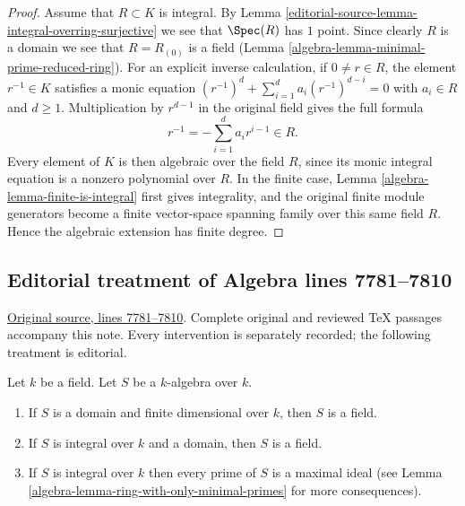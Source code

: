 \begin{proof}
Assume that $R \subset K$ is integral.
By Lemma \ref{editorial-source-lemma-integral-overring-surjective} we see that
$\Spec(R)$ has $1$ point. Since clearly $R$ is a domain we see
that $R = R_{(0)}$ is a field (Lemma \ref{algebra-lemma-minimal-prime-reduced-ring}).
For an explicit inverse calculation, if $0\ne r\in R$, the
element $r^{-1}\in K$ satisfies a monic equation
$(r^{-1})^d+\sum_{i=1}^d a_i(r^{-1})^{d-i}=0$ with $a_i\in R$
and $d\geq1$. Multiplication by $r^{d-1}$ in the original field
gives the full formula
$$
r^{-1}=-\sum_{i=1}^d a_i r^{i-1}\in R.
$$
Every element of $K$ is then algebraic over the field $R$, since
its monic integral equation is a nonzero polynomial over $R$.
In the finite case, Lemma \ref{algebra-lemma-finite-is-integral} first
gives integrality, and the original finite module generators
become a finite vector-space spanning family over this same field
$R$. Hence the algebraic extension has finite degree.
\end{proof}


\subsection{Editorial treatment of Algebra lines 7781--7810}

\hypertarget{algebra-context-083}{}

\noindent\href{https://github.com/stacks/stacks-project/blob/a04446e57ec1fbc252a871afcec7752fb2807b14/algebra.tex\#L7781}{Original source, lines 7781--7810}. Complete original and reviewed TeX passages accompany this note. Every intervention is separately recorded; the following treatment is editorial.


\begin{lemma}
\label{editorial-source-lemma-integral-over-field}
Let $k$ be a field. Let $S$ be a $k$-algebra over $k$.
\begin{enumerate}
\item If $S$ is a domain and finite dimensional over $k$,
then $S$ is a field.
\item If $S$ is integral over $k$ and a domain,
then $S$ is a field.
\item If $S$ is integral over $k$ then every prime of
$S$ is a maximal ideal (see
Lemma \ref{algebra-lemma-ring-with-only-minimal-primes}
for more consequences).
\end{enumerate}
\end{lemma}

